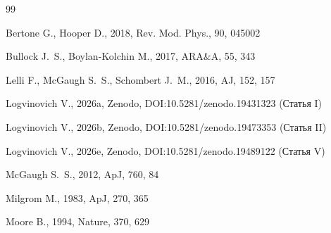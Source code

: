 \documentclass[12pt,a4paper]{article}
\begin{document}
\begin{thebibliography}{99}

Bertone G., Hooper D., 2018, Rev. Mod. Phys., 90, 045002

Bullock J.~S., Boylan-Kolchin M., 2017, ARA\&A, 55, 343

Lelli F., McGaugh S.~S., Schombert J.~M., 2016, AJ, 152, 157

Logvinovich V., 2026a, Zenodo, DOI:10.5281/zenodo.19431323 (Статья I)

Logvinovich V., 2026b, Zenodo, DOI:10.5281/zenodo.19473353 (Статья II)

Logvinovich V., 2026e, Zenodo, DOI:10.5281/zenodo.19489122 (Статья V)

McGaugh S.~S., 2012, ApJ, 760, 84

Milgrom M., 1983, ApJ, 270, 365

Moore B., 1994, Nature, 370, 629

\end{thebibliography}
\end{document}
